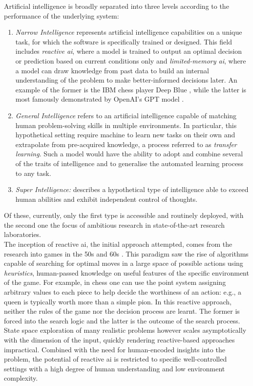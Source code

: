 Artificial intelligence is broadly separated into three levels according to the performance of the underlying system: 
\begin{enumerate}
    \item \textit{Narrow Intelligence} represents artificial intelligence capabilities on a unique task, for which the software is specifically trained or designed. This field includes \textit{reactive \gls{ai}}, where a model is trained to output an optimal decision or prediction based on current conditions only and \textit{limited-memory \gls{ai}}, where a model can draw knowledge from past data to build an internal understanding of the problem to make better-informed decisions later. An example of the former is the IBM chess player Deep Blue \cite{CAMPBELL200257}, while the latter is most famously demonstrated by OpenAI's GPT model \cite{openai2024gpt4}. 
    \item \textit{General Intelligence} refers to an artificial intelligence capable of matching human problem-solving skills in multiple environments. In particular, this hypothetical setting require machine to learn new tasks on their own and extrapolate from pre-acquired knowledge, a process referred to as \textit{transfer learning}. Such a model would have the ability to adopt and combine several of the traits of intelligence and to generalise the automated learning process to any task.
    \item \textit{Super Intelligence:} describes a hypothetical type of intelligence able to exceed human abilities and exhibit independent control of thoughts. 
\end{enumerate}
Of these, currently, only the first type is accessible and routinely deployed, with the second one the focus of ambitious research in state-of-the-art research laboratories. \\

The inception of reactive \gls{ai}, the initial approach attempted, comes from the research into games in the 50s and 60s \cite{russel2010}. This paradigm saw the rise of algorithms capable of searching for optimal moves in a large space of possible actions using \textit{heuristics}, human-passed knowledge on useful features of the specific environment of the game. For example, in chess one can use the point system assigning arbitrary values to each piece to help decide the worthiness of an action: e.g., a queen is typically worth more than a simple pion. In this reactive approach, neither the rules of the game nor the decision process are learnt. The former is forced into the search logic and the latter is the outcome of the search process. State space exploration of many realistic problems however scales asymptotically with the dimension of the input, quickly rendering reactive-based approaches impractical. Combined with the need for human-encoded insights into the problem, the potential of reactive \gls{ai} is restricted to specific well-controlled settings with a high degree of human understanding and low environment complexity. \\

